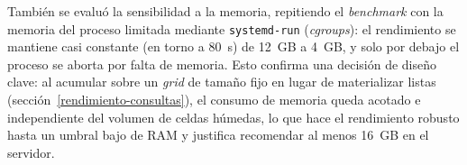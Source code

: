 También se evaluó la sensibilidad a la memoria, repitiendo el \textit{benchmark} con la memoria del proceso limitada mediante \texttt{systemd-run} (\textit{cgroups}): el rendimiento se mantiene casi constante (en torno a 80~s) de 12~GB a 4~GB, y solo por debajo el proceso se aborta por falta de memoria. Esto confirma una decisión de diseño clave: al acumular sobre un \textit{grid} de tamaño fijo en lugar de materializar listas (sección~\ref{rendimiento-consultas}), el consumo de memoria queda acotado e independiente del volumen de celdas húmedas, lo que hace el rendimiento robusto hasta un umbral bajo de RAM y justifica recomendar al menos 16~GB en el servidor.
